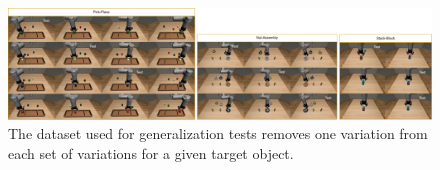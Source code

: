 \begin{figure}[t]
    \centering
    \includegraphics[width=1.0\textwidth]{figures/images/ch3/generalization_dataset.jpg}
    \caption{The dataset used for generalization tests removes one variation from each set of variations for a given target object.}
    \label{fig:generalization_dataset}
\end{figure}
